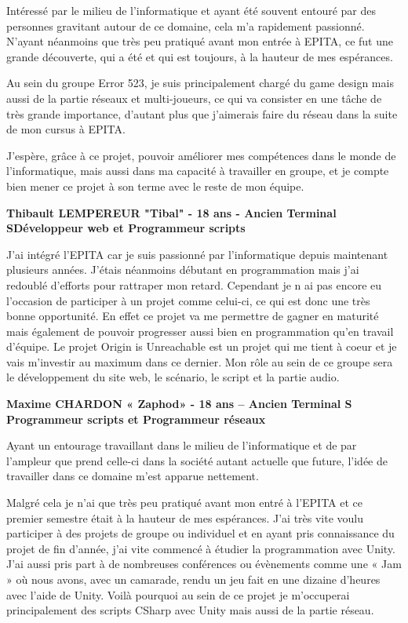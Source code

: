 \documentclass[12pt,a4paper]{article}
\begin{document}
Intéressé par le milieu de l'informatique et ayant été souvent entouré par des personnes gravitant autour de ce domaine, cela m'a rapidement passionné. N'ayant néanmoins que très peu pratiqué avant mon entrée à EPITA, ce fut une grande découverte, qui a été et qui est toujours, à la hauteur de mes espérances.

Au sein du groupe Error 523, je suis principalement chargé du game design mais aussi de la partie réseaux et multi-joueurs, ce qui va consister en une tâche de très grande importance, d'autant plus que j'aimerais faire du réseau dans la suite de mon cursus à EPITA.
   
J'espère, grâce à ce projet, pouvoir améliorer mes compétences dans le monde de l'informatique, mais aussi dans ma capacité à travailler en groupe, et je compte bien mener ce projet à son terme avec le reste de mon équipe.

\begin{center}
\textbf{Thibault LEMPEREUR "Tibal" - 18 ans - Ancien Terminal S\newline Développeur web et Programmeur scripts}

\end{center}

J'ai intégré l'EPITA car je suis passionné par l'informatique depuis maintenant plusieurs années. J'étais néanmoins débutant en programmation mais j'ai redoublé d'efforts pour rattraper mon retard. Cependant je n ai pas encore eu l'occasion de participer à un projet comme celui-ci, ce qui est donc une très bonne opportunité. En effet ce projet va me permettre de gagner en maturité mais également de pouvoir progresser aussi bien en programmation qu'en travail d'équipe. Le projet Origin is Unreachable est un projet qui me tient à coeur et je vais m'investir au maximum dans ce dernier. Mon rôle au sein de ce groupe sera le développement du site web, le scénario, le script et la partie audio. 
\newpage
\begin{center}
\textbf{Maxime CHARDON « Zaphod» - 18 ans – Ancien Terminal S
Programmeur scripts et Programmeur réseaux}
\end{center}

Ayant un entourage travaillant dans le milieu de l'informatique et de par l'ampleur que prend celle-ci dans la société autant actuelle que future, l'idée de travailler dans ce domaine m'est apparue nettement.

Malgré cela je n'ai que très peu pratiqué avant mon entré à l'EPITA et ce premier semestre était à la hauteur de mes espérances. J'ai très vite voulu participer à des projets de groupe ou individuel et en ayant pris connaissance du projet de fin d'année, j'ai vite commencé à étudier la programmation avec Unity. J'ai aussi pris part à de nombreuses conférences ou évènements comme une « Jam » où nous avons, avec un camarade, rendu un jeu fait en une dizaine d'heures avec l'aide de Unity. Voilà pourquoi au sein de ce projet je m'occuperai principalement des scripts CSharp avec Unity mais aussi de la partie réseau.
\end{document}
